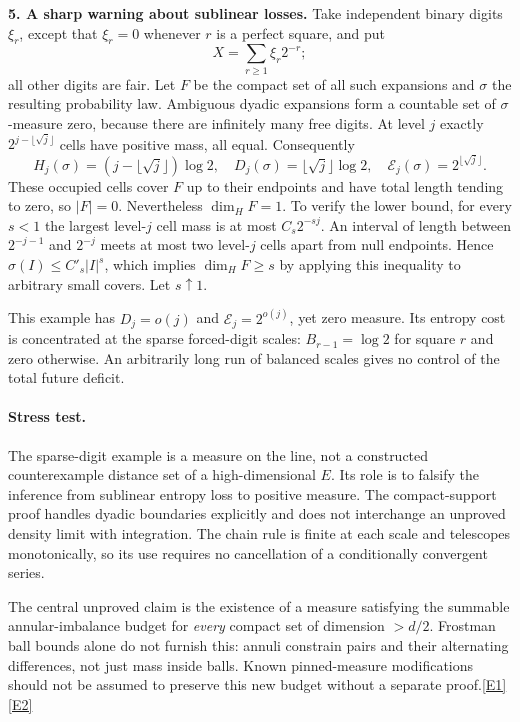 \documentclass[11pt,a4paper]{article}
\newcommand{\eref}[2]{\hyperlink{extra:#1:#2}{[E#2]}}
\begin{document}
\textbf{5. A sharp warning about sublinear losses.}
Take independent binary digits $\xi_r$, except that $\xi_r=0$ whenever
$r$ is a perfect square, and put
\[
 X=\sum_{r\ge1}\xi_r2^{-r};
\]
all other digits are fair. Let $F$ be the compact set of all such expansions
and $\sigma$ the resulting probability law. Ambiguous dyadic expansions
form a countable set of $\sigma$-measure zero, because there are infinitely
many free digits. At level $j$ exactly $2^{j-\lfloor\sqrt j\rfloor}$ cells
have positive mass, all equal. Consequently
\begin{equation}\label{209:sparse}
 H_j(\sigma)=(j-\lfloor\sqrt j\rfloor)\log2,
 \quad D_j(\sigma)=\lfloor\sqrt j\rfloor\log2,
 \quad \mathcal E_j(\sigma)=2^{\lfloor\sqrt j\rfloor}.
\end{equation}
These occupied cells cover $F$ up to their endpoints and have total length
tending to zero, so $|F|=0$. Nevertheless $\dim_H F=1$. To verify the lower
bound, for every $s<1$ the largest level-$j$ cell mass is at most
$C_s2^{-sj}$. An interval of length between $2^{-j-1}$ and $2^{-j}$ meets
at most two level-$j$ cells apart from null endpoints. Hence
$\sigma(I)\le C'_s|I|^s$, which implies $\dim_H F\ge s$ by applying this
inequality to arbitrary small covers. Let $s\uparrow1$.

This example has $D_j=o(j)$ and $\mathcal E_j=2^{o(j)}$, yet zero measure.
Its entropy cost is concentrated at the sparse forced-digit scales:
$B_{r-1}=\log2$ for square $r$ and zero otherwise. An arbitrarily long
run of balanced scales gives no control of the total future deficit.

\paragraph{Stress test.}
The sparse-digit example is a measure on the line, not a constructed
counterexample distance set of a high-dimensional $E$. Its role is to
falsify the inference from sublinear entropy loss to positive measure.
The compact-support proof handles dyadic boundaries explicitly and does
not interchange an unproved density limit with integration. The chain
rule is finite at each scale and telescopes monotonically, so its use
requires no cancellation of a conditionally convergent series.

The central unproved claim is the existence of a measure satisfying the
summable annular-imbalance budget for \emph{every} compact set of dimension
$>d/2$. Frostman ball bounds alone do not furnish this: annuli constrain
pairs and their alternating differences, not just mass inside balls.
Known pinned-measure modifications should not be assumed to preserve this
new budget without a separate proof.\eref{209}{1}\eref{209}{2}
\end{document}
